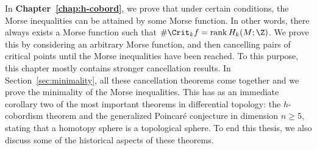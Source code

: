 \bigskip
In \textbf{Chapter~\ref{chap:h-cobord}}, we prove that under certain conditions, the Morse inequalities can be attained by some Morse function.
In other words, there always exists a Morse function such that $\# \Crit_k f = \operatorname{rank} H_k(M; \Z)$.
We prove this by considering an arbitrary Morse function,
and then cancelling pairs of critical points until the Morse inequalities have been reached.
To this purpose, this chapter mostly contains stronger cancellation results.
In Section~\ref{sec:minimality}, all these cancellation theorems come together and we prove the minimality of the Morse inequalities.
This has as an immediate corollary two of the most important theorems in differential topology: the $h$-cobordism theorem and the generalized Poincaré conjecture in dimension $n \ge 5$, stating that a homotopy sphere is a topological sphere.
To end this thesis, we also discuss some of the historical aspects of these theorems.
